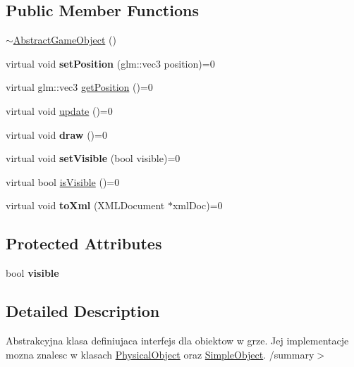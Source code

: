 \subsection*{Public Member Functions}
\begin{DoxyCompactItemize}
\item 
\hyperlink{class_abstract_game_object_aaf1bae3e1afb1b7269122466d41cb350}{$\sim$\+Abstract\+Game\+Object} ()
\item 
\mbox{\label{class_abstract_game_object_aeec87788c72b2492040917cabb7f5c6e}} 
virtual void {\bfseries set\+Position} (glm\+::vec3 position)=0
\item 
virtual glm\+::vec3 \hyperlink{class_abstract_game_object_ac934d513fd18a520d8b68dd5a7ac7399}{get\+Position} ()=0
\item 
virtual void \hyperlink{class_abstract_game_object_a162f800603ac5671ff24ad8042c062b5}{update} ()=0
\item 
\mbox{\label{class_abstract_game_object_a77d713fdeeed8310e4152dbf352d988e}} 
virtual void {\bfseries draw} ()=0
\item 
\mbox{\label{class_abstract_game_object_a4688b8a17299804d82c99160851b68ce}} 
virtual void {\bfseries set\+Visible} (bool visible)=0
\item 
virtual bool \hyperlink{class_abstract_game_object_afddc4040f2d1a7effc0e0baa9950b2e2}{is\+Visible} ()=0
\item 
\mbox{\label{class_abstract_game_object_a1fdfaf1362c1635965dd194d7f22743c}} 
virtual void {\bfseries to\+Xml} (X\+M\+L\+Document $\ast$xml\+Doc)=0
\end{DoxyCompactItemize}
\subsection*{Protected Attributes}
\begin{DoxyCompactItemize}
\item 
\mbox{\label{class_abstract_game_object_a3a116439cb78825f98b1252746d16dc0}} 
bool {\bfseries visible}
\end{DoxyCompactItemize}


\subsection{Detailed Description}
Abstrakcyjna klasa definiujaca interfejs dla obiektow w grze. Jej implementacje mozna znalesc w klasach \hyperlink{class_physical_object}{Physical\+Object} oraz \hyperlink{class_simple_object}{Simple\+Object}. /summary$>$ 

